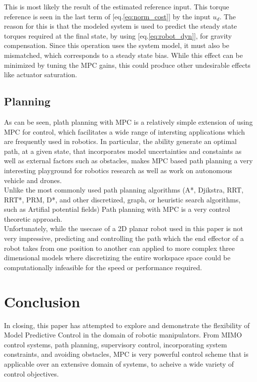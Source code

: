 \documentclass[journal]{IEEEtran}
\begin{document}
This is most likely the result of the estimated reference input. This torque reference is seen in the last term of [eq.\ref{eq:norm_cost}] by the input $u_d$. The reason for this is that the modeled system is used to predict the steady state torques required at the final state, by using [eq.\ref{eq:robot_dyn}], for gravity compensation. Since this operation uses the system model, it must also be mismatched, which corresponds to a steady state bias. While this effect can be minimized by tuning the MPC gains, this could produce other undesirable effects like actuator saturation.


\subsection{Planning}

As can be seen, plath planning with MPC is a relatively simple extension of using MPC for control, which facilitates a wide range of intersting applications which are frequently used in robotics. In particular, the ability generate an optimal path, at a given state, that incorporates model uncertainties and constaints as well as external factors such as obstacles, makes MPC based path planning a very interesting playground for robotics research as well as work on autonomous vehicle and drones. \\

Unlike the most commonly used path planning algorithms (A*, Djikstra, RRT, RRT*, PRM, D*, and other discretized, graph, or heuristic search algorithms, such as Artifial potential fields) Path planning with MPC is a very control theoretic approach.\\

Unfortunately, while the usecase of a 2D planar robot used in this paper is not very impressive, predicting and controlling the path which the end effector of a robot takes from one position to another can applied to more complex three dimensional models where discretizing the entire workspace space could be computationally infeasible for the speed or performance required. \\

\section{Conclusion}
In closing, this paper has attempted to explore and demonstrate the flexibility of Model Predictive Control in the domain of robotic manipulators. From MIMO control systems, path planning, supervisory control, incorporating system constraints, and avoiding obstacles, MPC is very powerful control scheme that is applicable over an extensive domain of systems, to acheive a wide variety of control objectives.
\end{document}
